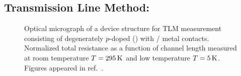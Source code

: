 \subsection{Transmission Line Method: \degenerate}\label{subsec:TLM_degenerate}
\begin{figure}[ht]
	\centering
	\caption[TLM: contact resistances using \degenerate]{\protect{} Optical micrograph of a device structure for \acs{TLM} measurement consisting of degenerately $p$-doped  (\degenerate) with / metal contacts. \protect{} Normalized total resistance as a function of channel length measured at room temperature $T=295\,\mathrm{K}$ and \protect{} low temperature $T=5\,\mathrm{K}$. Figures appeared in ref.~\cite{Chuang_2016}.}
	\label{fig:tlm_resistance_measurement_degenerate}
\end{figure}

